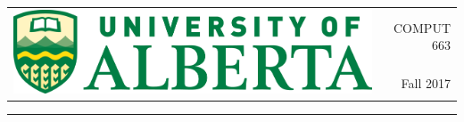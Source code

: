 \documentclass[12pt]{article}
\begin{document}
\begin{tabularx}{\textwidth}{Xr}
\multirow{2}{*}{\includegraphics[scale=0.25]{UA-COLOUR.png}}& \large COMPUT 663\\
&\large Fall 2017\\
\end{tabularx}

\vspace{0.2cm}
{\color{black}\rule{\textwidth}{.25ex}}%
\vspace{0.2cm}
\end{document}
